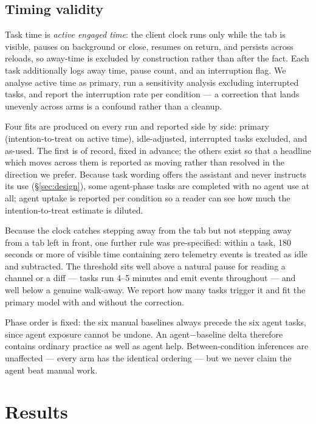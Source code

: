 \documentclass[acmsmall,review,screen]{acmart}
\begin{document}
\subsection{Timing validity}\label{sec:timing}

Task time is \emph{active engaged time}: the client clock runs only while the tab
is visible, pauses on background or close, resumes on return, and persists across
reloads, so away-time is excluded by construction rather than after the fact.
Each task additionally logs away time, pause count, and an interruption flag. We
analyse active time as primary, run a sensitivity analysis excluding interrupted
tasks, and report the interruption rate per condition --- a correction that lands
unevenly across arms is a confound rather than a cleanup.

Four fits are produced on every run and reported side by side: primary
(intention-to-treat on active time), idle-adjusted, interrupted tasks excluded,
and as-used. The first is of record, fixed in advance; the others exist so that a
headline which moves across them is reported as moving rather than resolved in
the direction we prefer. Because task wording offers the assistant and never
instructs its use (\S\ref{sec:design}), some agent-phase tasks are completed with
no agent use at all; agent uptake is reported per condition so a reader can see
how much the intention-to-treat estimate is diluted.

Because the clock catches stepping away from the tab but not stepping away from a
tab left in front, one further rule was pre-specified: within a task, 180 seconds
or more of visible time containing zero telemetry events is treated as idle and
subtracted. The threshold sits well above a natural pause for reading a channel
or a diff --- tasks run 4--5 minutes and emit events throughout --- and well
below a genuine walk-away. We report how many tasks trigger it and fit the
primary model with and without the correction.

Phase order is fixed: the six manual baselines always precede the six agent
tasks, since agent exposure cannot be undone. An agent$-$baseline delta therefore
contains ordinary practice as well as agent help. Between-condition inferences
are unaffected --- every arm has the identical ordering --- but we never claim
the agent beat manual work.

\section{Results}\label{sec:results}
\end{document}
